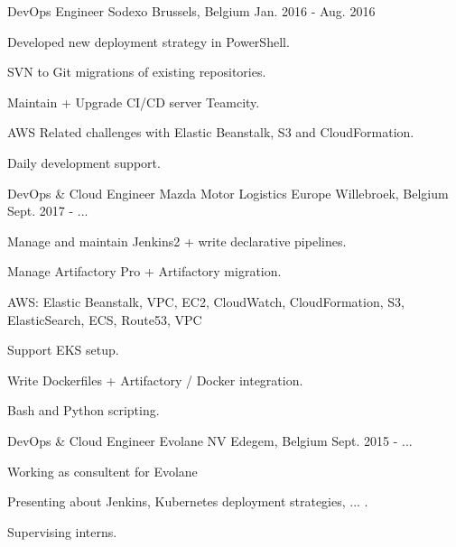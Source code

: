 \begin{cventries}
  \cventry
    {DevOps Engineer} %
    {Sodexo} %
    {Brussels, Belgium} %
    {Jan. 2016 - Aug. 2016} %
    {
      \begin{cvitems} %
        \item {Developed new deployment strategy in PowerShell.}
        \item {SVN to Git migrations of existing repositories.}
        \item {Maintain + Upgrade CI/CD server Teamcity.}
        \item {AWS Related challenges with Elastic Beanstalk, S3 and CloudFormation.}
        \item {Daily development support.}
      \end{cvitems}
    }

  \cventry
    {DevOps \& Cloud Engineer} %
    {Mazda Motor Logistics Europe} %
    {Willebroek, Belgium} %
    {Sept. 2017 - ...} %
    {
      \begin{cvitems} %
        \item {Manage and maintain Jenkins2 + write declarative pipelines.}
        \item {Manage Artifactory Pro + Artifactory migration.}
        \item {AWS: Elastic Beanstalk, VPC, EC2, CloudWatch, CloudFormation, S3, ElasticSearch, ECS, Route53, VPC}
        \item {Support EKS setup.}
        \item {Write Dockerfiles + Artifactory / Docker integration.}
        \item {Bash and Python scripting.}
      \end{cvitems}
    }

  \cventry
    {DevOps \& Cloud Engineer} %
    {Evolane NV} %
    {Edegem, Belgium} %
    {Sept. 2015 - ...} %
    {
      \begin{cvitems} %
        \item {Working as consultent for Evolane}
        \item {Presenting about Jenkins, Kubernetes deployment strategies, ... .}
        \item {Supervising interns.}
      \end{cvitems}
    }

\end{cventries}
